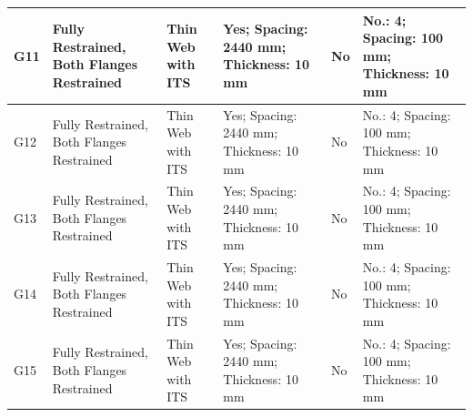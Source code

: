\documentclass[12pt,a4paper]{report}
\numberwithin{table}{chapter}
\numberwithin{figure}{chapter}
\begin{document}
\begin{longtable}{|L{1.4cm}|p{2.2cm}|p{2.2cm}|p{3.0cm}|p{2.4cm}|p{2.2cm}|}
\hline
G11 & Fully Restrained, Both Flanges Restrained & Thin Web with ITS & Yes; Spacing: 2440 mm; Thickness: 10 mm & No & No.: 4; Spacing: 100 mm; Thickness: 10 mm \\[8pt]
\hline
G12 & Fully Restrained, Both Flanges Restrained & Thin Web with ITS & Yes; Spacing: 2440 mm; Thickness: 10 mm & No & No.: 4; Spacing: 100 mm; Thickness: 10 mm \\[8pt]
\hline
G13 & Fully Restrained, Both Flanges Restrained & Thin Web with ITS & Yes; Spacing: 2440 mm; Thickness: 10 mm & No & No.: 4; Spacing: 100 mm; Thickness: 10 mm \\[8pt]
\hline
G14 & Fully Restrained, Both Flanges Restrained & Thin Web with ITS & Yes; Spacing: 2440 mm; Thickness: 10 mm & No & No.: 4; Spacing: 100 mm; Thickness: 10 mm \\[8pt]
\hline
G15 & Fully Restrained, Both Flanges Restrained & Thin Web with ITS & Yes; Spacing: 2440 mm; Thickness: 10 mm & No & No.: 4; Spacing: 100 mm; Thickness: 10 mm \\[8pt]
\hline
\end{longtable}



\newpage

\vspace{0.4em}
\setlength{\tabcolsep}{4pt}
\setlength\LTleft{0pt}
\setlength\LTright{\fill}
\end{document}
